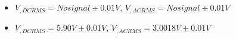 \begin{itemize}
     \item $V_{, DCRMS}=No signal\pm 0.01\unit{V}$, $V_{, ACRMS}=No signal\pm 0.01\unit{V}$ 
     \item $V_{, DCRMS}=5.90V\pm 0.01\unit{V}$, $V_{, ACRMS}=3.0018V\pm 0.01\unit{V}$\\
\end{itemize}